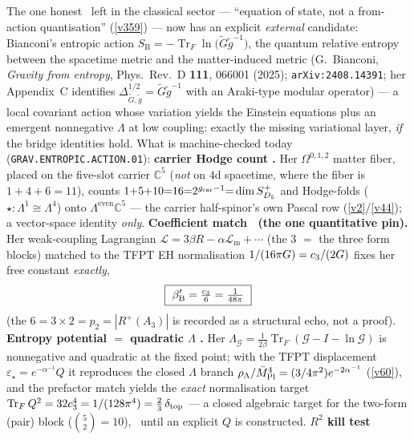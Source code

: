 \begin{keybox}
The one honest \mO\ left in the classical sector --- ``equation of state, not a from-action quantisation''
(\vref{v359}) --- now has an explicit \emph{external} candidate: Bianconi's entropic action
$S_{\mathrm B}=-\operatorname{Tr}_F\ln\bigl(\widetilde G\widetilde g^{-1}\bigr)$, the quantum relative
entropy between the spacetime metric and the matter-induced metric
(G.~Bianconi, \emph{Gravity from entropy}, Phys.\ Rev.\ D \textbf{111}, 066001 (2025);
\texttt{arXiv:2408.14391}; her Appendix~C identifies $\Delta^{1/2}_{\widetilde G,\widetilde g}
=\widetilde G\widetilde g^{-1}$ with an Araki-type modular operator) --- a local covariant action whose
variation yields the Einstein equations plus an emergent nonnegative $\Lambda$ at low coupling: exactly the
missing variational layer, \emph{if} the bridge identities hold. What is machine-checked today
(\texttt{GRAV.ENTROPIC.ACTION.01}): \textbf{carrier Hodge count \mE.} Her $\Omega^{0,1,2}$ matter fiber,
placed on the five-slot carrier $\mathbb C^5$ (\emph{not} on $4$d spacetime, where the fiber is
$1{+}4{+}6{=}11$), counts $1{+}5{+}10{=}16{=}2^{g_{\mathrm{car}}-1}{=}\dim S^+_{D_5}$ and Hodge-folds
($\star:\Lambda^1{\cong}\Lambda^4$) onto $\Lambda^{\mathrm{even}}\mathbb C^5$ --- the carrier half-spinor's
own Pascal row (\vref{v2}/\vref{v44}); a vector-space identity \emph{only}. \textbf{Coefficient match \mE\
(the one quantitative pin).} Her weak-coupling Lagrangian $\mathcal L=3\beta R-\alpha\mathcal L_{\mathrm m}
+\cdots$ (the $3$ $=$ the three form blocks) matched to the TFPT EH normalisation
$1/(16\pi G)=c_3/(2G)$ fixes her free constant \emph{exactly},
\[
  \boxed{\ \beta'_{\mathrm B}=\tfrac{\cthree}{6}=\tfrac1{48\pi}\ }
\]
(the $6=3\times2=p_2=|R^+(A_3)|$ is recorded as a structural echo, not a proof). \textbf{Entropy potential
$=$ quadratic $\Lambda$ \mE.} Her $\Lambda_{\mathcal G}=\tfrac1{2\beta}\operatorname{Tr}_F(\mathcal G-I-
\ln\mathcal G)$ is nonnegative and quadratic at the fixed point; with the TFPT displacement
$\varepsilon_\star=e^{-\alpha^{-1}}Q$ it reproduces the closed $\Lambda$ branch
$\rho_\Lambda/\bar M_{\mathrm{Pl}}^4=(3/4\pi^2)e^{-2\alpha^{-1}}$ (\vref{v60}), and the prefactor match yields the
\emph{exact} normalisation target $\operatorname{Tr}_FQ^2=32c_3^4=1/(128\pi^4)=\tfrac23\,
\delta_{\mathrm{top}}$ --- a closed algebraic target for the two-form (pair) block
($\binom52{=}10$), \mC\ until an explicit $Q$ is constructed. \textbf{$R^2$ kill test \mE\
}
\end{keybox}
